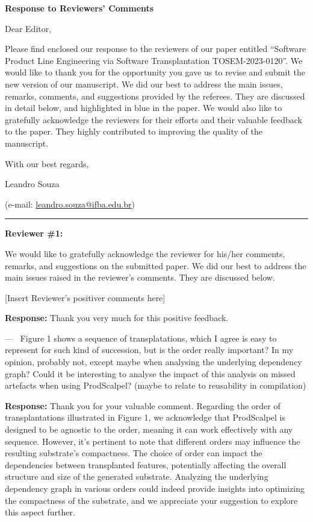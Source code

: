 \documentclass[a4paper,11pt]{letter}
\newcounter{reviewer}
\newcounter{point}[reviewer]
\renewcommand{\thepoint}{P\,\thereviewer.\arabic{point}}
\newenvironment{point}
   {\refstepcounter{point} \bigskip \noindent {\textbf{Reviewer~Point~\thepoint} } ---\ }
   {\par }
\newcommand{\bluetext}[1]{\begingroup\color{black}#1\endgroup}
\newcommand{\response}[1]{\textbf{Response:} \begingroup\color{black}#1\endgroup}
\begin{document}
\begin{letter}{\textbf{Response to Reviewers' Comments}}

  \opening{\bluetext{Dear Editor,}}

  \bluetext{%
    Please find enclosed our response to the reviewers of our paper entitled
    ``Software Product Line Engineering via Software Transplantation TOSEM-2023-0120''.
    We would like to thank you for the opportunity you gave us to revise and submit the new version of our manuscript.
    We did our best to address the main issues, remarks, comments, and suggestions provided by the referees.
    They are discussed in detail below, and highlighted in blue in the paper.
    We would also like to gratefully acknowledge the reviewers for their efforts and their valuable feedback to the paper.
    They highly contributed to improving the quality of the manuscript.

  }
\bluetext{With our best regards,}

\bluetext{Leandro Souza}

  \bluetext{(e-mail: \href{mailto:leandro.souza@ifba.edu.br}{leandro.souza@ifba.edu.br})}

  \noindent\rule{\textwidth}{0.4pt}

  \textbf{Reviewer \#1:}

  \bluetext{%
    We would like to gratefully acknowledge the reviewer for his/her comments, remarks, and suggestions on the submitted paper.
    We did our best to address the main issues raised in the reviewer's comments.
    They are discussed below.
  }

  [Insert Reviewer's positiver comments here]

  \response{Thank you very much for this positive feedback.}

\begin{point}
Figure 1 shows a sequence of transplatations, which I agree is easy to represent for such kind of succession, but is the order really important? In my opinion, probably not, except maybe when analysing the underlying dependency graph? Could it be interesting to analyse the impact of this analysis on missed artefacts when using ProdScalpel? (maybe to relate to reusability in compilation)
	\label{pt:foo}
\end{point}

\response{Thank you for your valuable comment. Regarding the order of transplantations illustrated in Figure 1, we acknowledge that ProdScalpel is designed to be agnostic to the order, meaning it can work effectively with any sequence. However, it's pertinent to note that different orders may influence the resulting substrate's compactness. The choice of order can impact the dependencies between transplanted features, potentially affecting the overall structure and size of the generated substrate. Analyzing the underlying dependency graph in various orders could indeed provide insights into optimizing the compactness of the substrate, and we appreciate your suggestion to explore this aspect further.

}
\end{letter}
\end{document}
